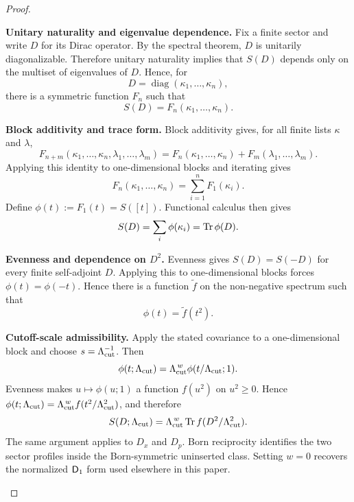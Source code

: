 \documentclass[12pt,a4paper]{article}
\begin{document}
\begin{proof}
\begin{proofsteps}
\item \textbf{Unitary naturality and eigenvalue dependence.}
Fix a finite sector and write \(D\) for its Dirac operator.  By the spectral theorem,
\(D\) is unitarily diagonalizable.  Therefore unitary naturality implies that
\(S(D)\) depends only on the multiset of eigenvalues of \(D\).  Hence, for
\[
        D=\operatorname{diag}(\kappa_1,\ldots,\kappa_n),
\]
there is a symmetric function \(F_n\) such that
\[
        S(D)=F_n(\kappa_1,\ldots,\kappa_n).
\]


\item \textbf{Block additivity and trace form.}
Block additivity gives, for all finite lists \(\kappa\) and \(\lambda\),
\[
F_{n+m}(\kappa_1,\ldots,\kappa_n,\lambda_1,\ldots,\lambda_m)
 =
F_n(\kappa_1,\ldots,\kappa_n)+F_m(\lambda_1,\ldots,\lambda_m).
\]
Applying this identity to one-dimensional blocks and iterating gives
\[
        F_n(\kappa_1,\ldots,\kappa_n)=\sum_{i=1}^n F_1(\kappa_i).
\]
Define \(\phi(t):=F_1(t)=S([t])\).  Functional calculus then gives
\[
        S(D)=\sum_i \phi(\kappa_i)=\operatorname{Tr}\phi(D).
\]


\item \textbf{Evenness and dependence on \(D^2\).}
Evenness gives \(S(D)=S(-D)\) for every finite self-adjoint \(D\).  Applying this to
one-dimensional blocks forces \(\phi(t)=\phi(-t)\).  Hence there is a function
\(\widetilde f\) on the non-negative spectrum such that
\[
        \phi(t)=\widetilde f(t^2).
\]

\item \textbf{Cutoff-scale admissibility.}
Apply the stated covariance to a one-dimensional block and choose
\(s=\Lambda_{\mathrm{cut}}^{-1}\).  Then
\[
 \phi(t;\Lambda_{\mathrm{cut}})
 =\Lambda_{\mathrm{cut}}^{\,w}\phi(t/\Lambda_{\mathrm{cut}};1).
\]
Evenness makes \(u\mapsto\phi(u;1)\) a function \(f(u^2)\) on
\(u^2\ge0\).  Hence
\(\phi(t;\Lambda_{\mathrm{cut}})=\Lambda_{\mathrm{cut}}^{\,w}f(t^2/\Lambda_{\mathrm{cut}}^2)\), and therefore
\[
        S(D;\Lambda_{\mathrm{cut}})=\Lambda_{\mathrm{cut}}^{\,w}\operatorname{Tr} f(D^2/\Lambda_{\mathrm{cut}}^2).
\]
The same argument applies to \(D_x\) and \(D_p\).  Born reciprocity identifies
the two sector profiles inside the Born-symmetric uninserted class.  Setting
\(w=0\) recovers the normalized \(\mathsf{D}_1\) form used elsewhere in this paper.
\end{proofsteps}
\end{proof}
\end{document}
